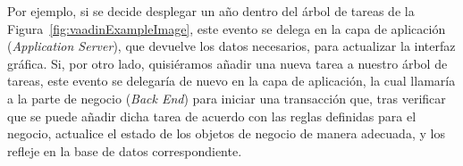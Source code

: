 Por ejemplo, si se decide desplegar un año dentro del árbol de tareas de la Figura~\ref{fig:vaadinExampleImage}, este evento se delega en la capa de aplicación (\emph{Application Server}), que devuelve los datos necesarios, para actualizar la interfaz gráfica. Si, por otro lado, quisiéramos añadir una nueva tarea a nuestro árbol de tareas, este evento se delegaría de nuevo en la capa de aplicación, la cual llamaría a la parte de negocio (\emph{Back End}) para iniciar una transacción que, tras verificar que se puede añadir dicha tarea de acuerdo con las reglas definidas para el negocio, actualice el estado de los objetos de negocio de manera adecuada, y los refleje en la base de datos correspondiente. 

